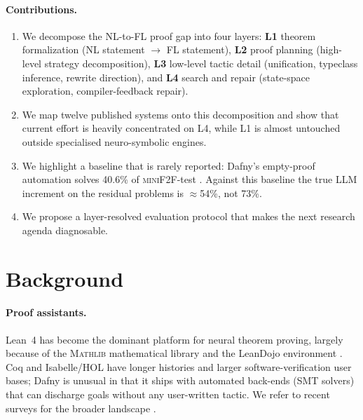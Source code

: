 \documentclass[11pt,letterpaper]{article}
\begin{document}
\paragraph{Contributions.}
\begin{enumerate}[leftmargin=*]
  \item We decompose the NL-to-FL proof gap into four layers:
        \textbf{L1} theorem formalization (NL statement $\to$ FL
        statement), \textbf{L2} proof planning (high-level strategy
        decomposition), \textbf{L3} low-level tactic detail
        (unification, typeclass inference, rewrite direction), and
        \textbf{L4} search and repair (state-space exploration,
        compiler-feedback repair).
  \item We map twelve published systems onto this decomposition and
        show that current effort is heavily concentrated on L4, while
        L1 is almost untouched outside specialised neuro-symbolic
        engines.
  \item We highlight a baseline that is rarely reported: Dafny's
        empty-proof automation solves 40.6\% of \textsc{miniF2F}-test
        \cite{baksys2025mini2f2dafny}. Against this baseline the true
        LLM increment on the residual problems is $\approx$54\%, not
        73\%.
  \item We propose a layer-resolved evaluation protocol that makes the
        next research agenda diagnosable.
\end{enumerate}

\section{Background}
\label{sec:bg}

\paragraph{Proof assistants.}
Lean~4 has become the dominant platform for neural theorem proving,
largely because of the \textsc{Mathlib} mathematical library and the
LeanDojo environment \cite{song2024leancopilot}. Coq and Isabelle/HOL
have longer histories and larger software-verification user bases;
Dafny is unusual in that it ships with automated back-ends (SMT
solvers) that can discharge goals without any user-written tactic.
We refer to recent surveys for the broader landscape
\cite{lu2023survey,meadows2023mathnlp}.
\end{document}

